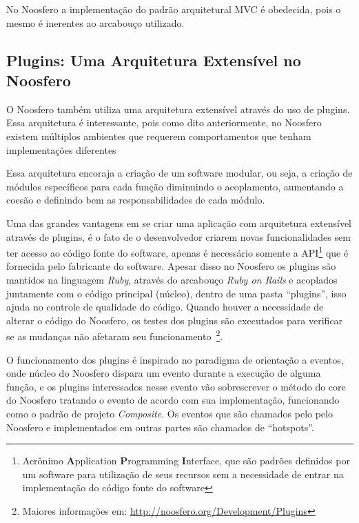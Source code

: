 No Noosfero a implementação do padrão arquitetural MVC é obedecida, pois o mesmo é inerentes ao arcabouço utilizado.

\subsection{Plugins: Uma Arquitetura Extensível no Noosfero}
\label{sub:arquiteturaplugin}
O Noosfero também utiliza uma arquitetura extensível através do uso de plugins. Essa arquitetura é interessante, pois como dito anteriormente, no Noosfero existem múltiplos ambientes que requerem comportamentos que tenham implementações diferentes %

Essa arquitetura encoraja a criação de um software modular, ou seja, a criação de módulos específicos para cada função diminuindo o acoplamento, aumentando a coesão e definindo bem as responsabilidades de cada módulo.  

Uma das grandes vantagens em se criar uma aplicação com arquitetura extensível através de plugins, é o fato de o desenvolvedor criarem novas funcionalidades sem ter acesso ao código fonte do software, apenas é necessário somente a API\footnote{Acrônimo \textbf{A}pplication \textbf{P}rogramming \textbf{I}nterface, que são padrões definidos por um software para utilização de seus recursos sem a necessidade de entrar na implementação do código fonte do software} que é fornecida pelo fabricante do software. Apesar disso no Noosfero os plugins são mantidos na linguagem \textit{Ruby}, através do arcabouço \textit{Ruby on Rails} e acoplados juntamente com o código principal (núcleo), dentro de uma pasta “plugins”, isso ajuda no controle de qualidade do código. Quando houver a necessidade de alterar o código do Noosfero, os testes dos plugins são executados para verificar se as mudanças não afetaram seu funcionamento~\footnote{Maiores informações em: \url{http://noosfero.org/Development/Plugins}}.

O funcionamento dos plugins é inspirado no paradigma de orientação a eventos, onde núcleo do Noosfero dispara um evento durante a execução de alguma função, e os plugins interessados nesse evento vão sobrescrever o método do core do Noosfero tratando o evento de acordo com sua implementação, funcionando como o padrão de projeto \textit{Composite}. Os eventos que são chamados pelo pelo Noosfero e implementados em outras partes são chamados de “hotspots”.

